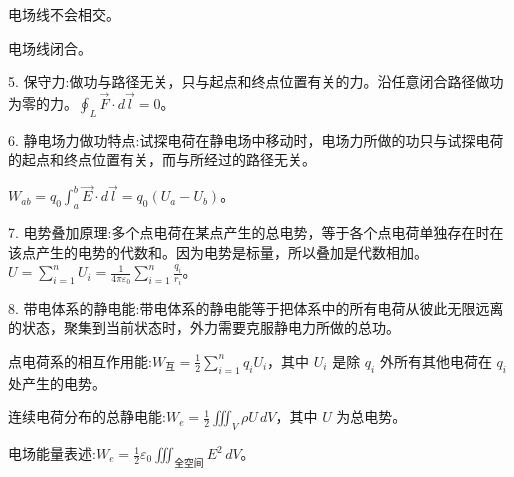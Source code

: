 \documentclass{article}
\begin{document}
电场线不会相交。

电场线闭合。


 5. 保守力:做功与路径无关，只与起点和终点位置有关的力。沿任意闭合路径做功为零的力。$ \oint_L \vec{F} \cdot d\vec{l} = 0 $。

 6. 静电场力做功特点:试探电荷在静电场中移动时，电场力所做的功只与试探电荷的起点和终点位置有关，而与所经过的路径无关。
 
 $W_{ab} = q_0 \int_a^b \vec{E} \cdot d\vec{l} = q_0 (U_a - U_b) $。

 7. 电势叠加原理:多个点电荷在某点产生的总电势，等于各个点电荷单独存在时在该点产生的电势的代数和。因为电势是标量，所以叠加是代数相加。$ U = \sum_{i=1}^n U_i = \frac{1}{4\pi\varepsilon_0} \sum_{i=1}^n \frac{q_i}{r_i} $。

 8. 带电体系的静电能:带电体系的静电能等于把体系中的所有电荷从彼此无限远离的状态，聚集到当前状态时，外力需要克服静电力所做的总功。

点电荷系的相互作用能:$ W_{\text{互}} = \frac{1}{2} \sum_{i=1}^n q_i U_i $，其中 $ U_i $ 是除 $ q_i $ 外所有其他电荷在 $ q_i $ 处产生的电势。

连续电荷分布的总静电能:$ W_e = \frac{1}{2} \iiint_V \rho U \, dV $，其中 $ U $ 为总电势。

电场能量表述:$ W_e = \frac{1}{2} \varepsilon_0 \iiint_{\text{全空间}} E^2 \, dV $。
\end{document}
